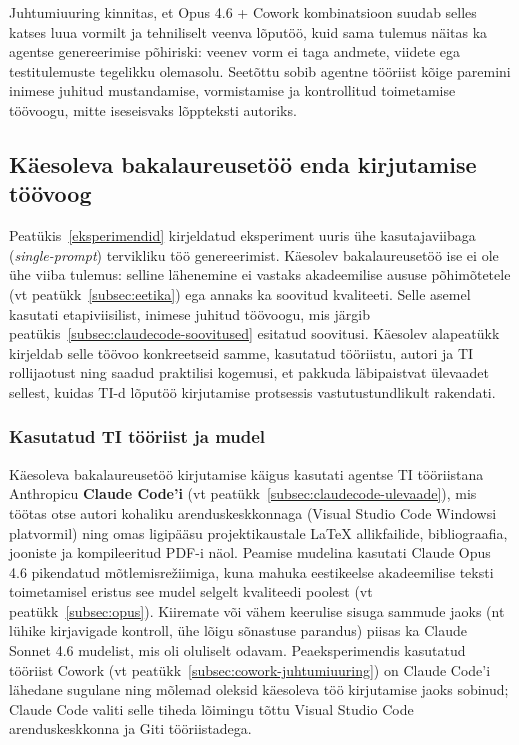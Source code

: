 Juhtumiuuring kinnitas, et Opus 4.6 + Cowork kombinatsioon suudab selles katses luua vormilt ja tehniliselt veenva lõputöö, kuid sama tulemus näitas ka agentse genereerimise põhiriski: veenev vorm ei taga andmete, viidete ega testitulemuste tegelikku olemasolu. Seetõttu sobib agentne tööriist kõige paremini inimese juhitud mustandamise, vormistamise ja kontrollitud toimetamise töövoogu, mitte iseseisvaks lõppteksti autoriks.

\subsection{Käesoleva bakalaureusetöö enda kirjutamise töövoog} \label{subsec:oma-too-toovoog}

Peatükis~\ref{eksperimendid} kirjeldatud eksperiment uuris ühe kasutajaviibaga (\textit{single-prompt}) tervikliku töö genereerimist. Käesolev bakalaureusetöö ise ei ole ühe viiba tulemus: selline lähenemine ei vastaks akadeemilise aususe põhimõtetele (vt peatükk~\ref{subsec:eetika}) ega annaks ka soovitud kvaliteeti. Selle asemel kasutati etapiviisilist, inimese juhitud töövoogu, mis järgib peatükis~\ref{subsec:claudecode-soovitused} esitatud soovitusi. Käesolev alapeatükk kirjeldab selle töövoo konkreetseid samme, kasutatud tööriistu, autori ja TI rollijaotust ning saadud praktilisi kogemusi, et pakkuda läbipaistvat ülevaadet sellest, kuidas TI-d lõputöö kirjutamise protsessis vastutustundlikult rakendati.

\subsubsection{Kasutatud TI tööriist ja mudel}

Käesoleva bakalaureusetöö kirjutamise käigus kasutati agentse TI tööriistana Anthropicu \textbf{Claude Code'i} (vt peatükk~\ref{subsec:claudecode-ulevaade}), mis töötas otse autori kohaliku arenduskeskkonnaga (Visual Studio Code Windowsi platvormil) ning omas ligipääsu projektikaustale \LaTeX{} allikfailide, bibliograafia, jooniste ja kompileeritud PDF-i näol. Peamise mudelina kasutati Claude Opus 4.6 pikendatud mõtlemisrežiimiga, kuna mahuka eestikeelse akadeemilise teksti toimetamisel eristus see mudel selgelt kvaliteedi poolest (vt peatükk~\ref{subsec:opus}). Kiiremate või vähem keerulise sisuga sammude jaoks (nt lühike kirjavigade kontroll, ühe lõigu sõnastuse parandus) piisas ka Claude Sonnet 4.6 mudelist, mis oli oluliselt odavam. Peaeksperimendis kasutatud tööriist Cowork (vt peatükk~\ref{subsec:cowork-juhtumiuuring}) on Claude Code'i lähedane sugulane ning mõlemad oleksid käesoleva töö kirjutamise jaoks sobinud; Claude Code valiti selle tiheda lõimingu tõttu Visual Studio Code arenduskeskkonna ja Giti tööriistadega.

